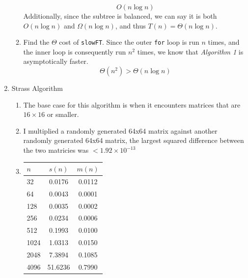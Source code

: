 \documentclass{article}
\begin{document}
\begin{enumerate}
\begin{enumerate}[label=\arabic*.]
                    \begin{equation*}
                        O(n \log n)
                    \end{equation*}
                    Additionally, since the subtree is balanced, we can say it is both \(O(n \log n)\) and \(\Omega(n \log n)\), and thus \(T(n) = \Theta(n \log n)\).
              \item Find the \(\Theta\) cost of \lstinline|slowFT|.
                    Since the outer \lstinline|for| loop is run \(n\) times, and the inner loop is consequently run \(n^2\) times, we know that \textit{Algorithm 1} is asymptotically faster.
                    \begin{equation*}
                        \Theta(n^2) > \Theta(n \log n)
                    \end{equation*}
          \end{enumerate}
    \item \pagebreak Strass Algorithm
          \begin{enumerate}[label=\arabic*.]
              \item The base case for this algorithm is when it encounters matrices that are \(16 \times 16\) or smaller.
              \item I multiplied a randomly generated 64x64 matrix against another randomly generated 64x64 matrix, the largest
                    squared difference between the two matricies was \(< 1.92 \times 10^{-13}\)
              \item \begin{tabular}{l|c|c}
                        $n$       & $s(n)$  & $m(n)$ \\
                        \hline 32 & 0.0176  & 0.0112 \\
                        64        & 0.0043  & 0.0001 \\
                        128       & 0.0035  & 0.0002 \\
                        256       & 0.0234  & 0.0006 \\
                        512       & 0.1993  & 0.0100 \\
                        1024      & 1.0313  & 0.0150 \\
                        2048      & 7.3894  & 0.1085 \\
                        4096      & 51.6236 & 0.7990
                    \end{tabular}
                    \raisebox{10em}{
}
\end{enumerate}
\end{enumerate}
\end{document}
